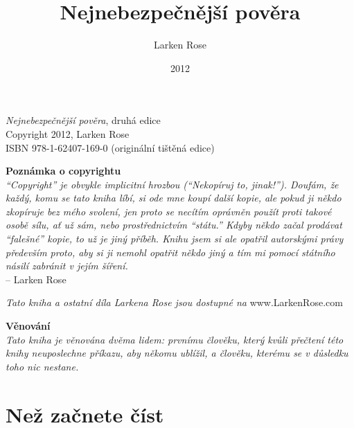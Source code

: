 \documentclass{book}
\title{Nejnebezpečnější pověra}
\author{Larken Rose}
\date{2012}
\begin{document}
\maketitle

\vspace*{\fill}

\begin{center}
  \emph{Nejnebezpečnější pověra}, druhá edice \\
  Copyright 2012, Larken Rose \\
  ISBN 978-1-62407-169-0 (originální tištěná edice)
\end{center}

\vspace{\fill}

\begin{center}
  \textbf{Poznámka o copyrightu} \\
  \emph{\enquote{Copyright} je obvykle implicitní hrozbou (\enquote{Nekopíruj to, jinak!}). Doufám, že každý, komu se tato kniha líbí, si ode mne koupí další kopie, ale pokud ji někdo zkopíruje bez mého svolení, jen proto se necítím oprávněn použít proti takové osobě sílu, ať už sám, nebo prostřednictvím \enquote{státu.} Kdyby někdo začal prodávat \enquote{falešné} kopie, to už je jiný příběh. Knihu jsem si ale opatřil autorskými právy především proto, aby si ji nemohl opatřit někdo jiný a tím mi pomocí státního násilí zabránit v jejím šíření.} \\
  -- Larken Rose
\end{center}

\tableofcontents

\begin{center}
  \emph{Tato kniha a ostatní díla Larkena Rose jsou dostupné na} www.LarkenRose.com
\end{center}

\newpage

\vspace*{\fill}

\begin{center}
  \textbf{Věnování} \\
  \emph{Tato kniha je věnována dvěma lidem: prvnímu člověku, který kvůli přečtení této knihy neuposlechne příkazu, aby někomu ublížil, a člověku, kterému se v důsledku toho nic nestane.}
\end{center}

\vspace*{\fill}

\newpage

\section{Než začnete číst}
\end{document}
